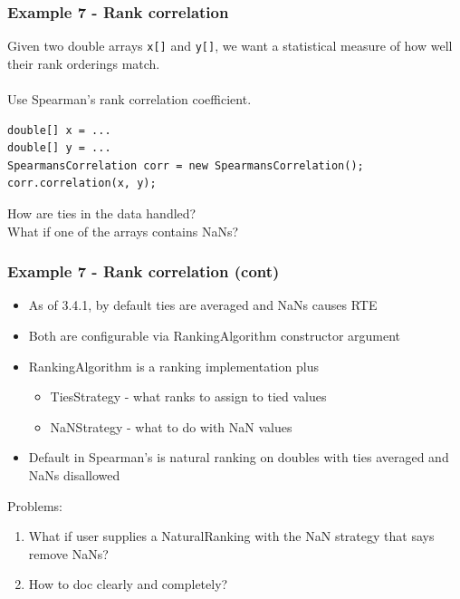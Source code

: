 \documentclass[14pt,mathserif]{beamer}
\begin{document}
\begin{frame}[fragile]
  \frametitle{Example 7 - Rank correlation}

Given two double arrays \texttt{x[]} and \texttt{y[]}, we want
a statistical measure of how well their rank orderings match. \\ ~ \\
Use Spearman's rank correlation coefficient.

\begin{verbatim}
double[] x = ...
double[] y = ...
SpearmansCorrelation corr = new SpearmansCorrelation();
corr.correlation(x, y);
\end{verbatim}

How are ties in the data handled? \\
What if one of the arrays contains NaNs?
\end{frame}

\begin{frame}
  \frametitle{Example 7 - Rank correlation (cont)}

\begin{small}
\begin{itemize}
\item As of 3.4.1, by default ties are averaged and NaNs causes RTE
\item Both are configurable via RankingAlgorithm constructor argument
\item RankingAlgorithm is a ranking implementation plus
\begin{itemize}
  \item TiesStrategy - what ranks to assign to tied values
  \item NaNStrategy - what to do with NaN values
\end{itemize}
\item Default in Spearman's is natural ranking on doubles with ties averaged and NaNs disallowed
\end{itemize}
Problems: 
\begin{enumerate}
\item What if user supplies a NaturalRanking with the NaN strategy that says remove NaNs? 
\item How to doc clearly and completely?
\end{enumerate}
\end{small}
\end{frame}
\end{document}
